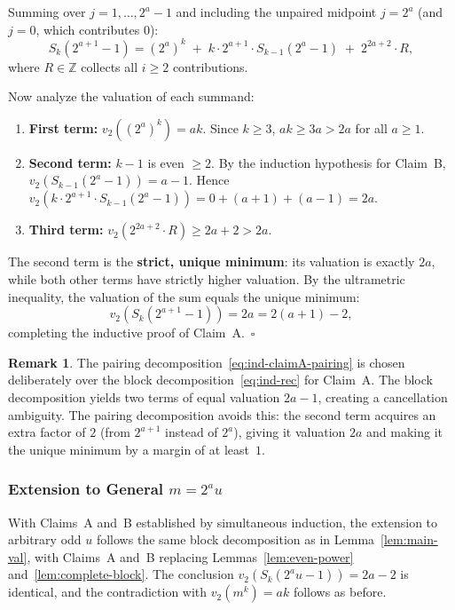 \documentclass[12pt,a4paper]{article}
\theoremstyle{plain}
\theoremstyle{definition}
\newtheorem{remark}[theorem]{Remark}
\newcommand{\Z}{\mathbb{Z}}
\begin{document}
Summing over $j = 1, \dots, 2^{a}-1$ and including the unpaired midpoint
$j = 2^{a}$ (and $j = 0$, which contributes $0$):
\begin{equation}\label{eq:ind-claimA-pairing}
  S_k(2^{a+1} - 1)
  = (2^{a})^k \;+\; k \cdot 2^{a+1} \cdot S_{k-1}(2^{a}-1) \;+\; 2^{2a+2} \cdot R,
\end{equation}
where $R \in \Z$ collects all $i \ge 2$ contributions.

Now analyze the valuation of each summand:
\begin{enumerate}[label=(\arabic*), nosep]
  \item \textbf{First term:} $v_2((2^{a})^k) = ak$.  Since $k \ge 3$,
    $ak \ge 3a > 2a$ for all $a \ge 1$.
  \item \textbf{Second term:} $k-1$ is even $\ge 2$.  By the induction
    hypothesis for Claim~B, $v_2(S_{k-1}(2^{a}-1)) = a-1$.
    Hence $v_2(k \cdot 2^{a+1} \cdot S_{k-1}(2^{a}-1))
    = 0 + (a+1) + (a-1) = 2a$.
  \item \textbf{Third term:} $v_2(2^{2a+2} \cdot R) \ge 2a+2 > 2a$.
\end{enumerate}

The second term is the \textbf{strict, unique minimum}: its valuation is
exactly $2a$, while both other terms have strictly higher valuation.
By the ultrametric inequality, the valuation of the sum equals the unique
minimum:
\[
  v_2(S_k(2^{a+1} - 1)) = 2a = 2(a+1) - 2,
\]
completing the inductive proof of Claim~A.~\hfill$\square$

\begin{remark}
  The pairing decomposition~\eqref{eq:ind-claimA-pairing} is chosen
  deliberately over the block decomposition~\eqref{eq:ind-rec} for Claim~A.
  The block decomposition yields two terms of equal valuation $2a-1$,
  creating a cancellation ambiguity.  The pairing decomposition avoids
  this: the second term acquires an extra factor of $2$ (from $2^{a+1}$
  instead of $2^a$), giving it valuation $2a$ and making it the unique
  minimum by a margin of at least~$1$.
\end{remark}

\subsubsection{Extension to General $m = 2^a u$}

With Claims~A and~B established by simultaneous induction, the extension to
arbitrary odd $u$ follows the same block decomposition as in
Lemma~\ref{lem:main-val}, with Claims~A and~B replacing
Lemmas~\ref{lem:even-power} and~\ref{lem:complete-block}.  The conclusion
$v_2(S_k(2^a u - 1)) = 2a - 2$ is identical, and the contradiction with
$v_2(m^k) = ak$ follows as before.
\end{document}
